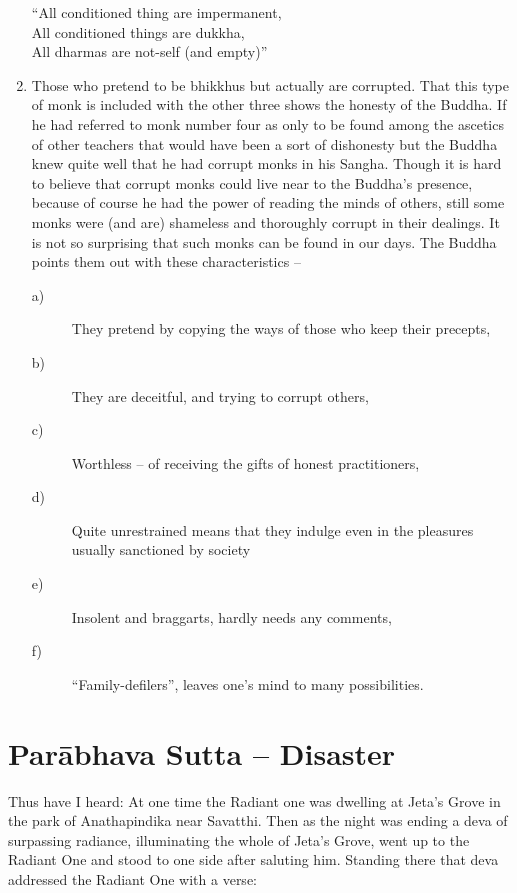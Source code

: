 \begin{enumerate}
\begin{MyDescription}[]{}   
   “All conditioned thing are impermanent,\\
   All conditioned things are dukkha,\\
   All dharmas are not-self (and empty)”
\end{MyDescription}
\item Those who pretend to be bhikkhus but actually are corrupted. That this type of monk is included with the other three shows the honesty of the Buddha. If he had referred to monk number four as only to be found among the ascetics of other teachers that would have been a sort of dishonesty but the Buddha knew quite well that he had corrupt monks in his Sangha. Though it is hard to believe that corrupt monks could live near to the Buddha's presence, because of course he had the power of reading the minds of others, still some monks were (and are) shameless and thoroughly corrupt in their dealings. It is not so surprising that such monks can be found in our days. The Buddha points them out with these characteristics – 
\begin{description}
\item[a)]They pretend by copying the ways of those who keep their precepts,
\item[b)]They are deceitful, and trying to corrupt others,
\item[c)]Worthless – of receiving the gifts of honest practitioners,
\item[d)]Quite unrestrained means that they indulge even in the pleasures usually sanctioned by society
\item[e)]Insolent and braggarts, hardly needs any comments,
\item[f)]“Family-defilers”, leaves one's mind to many possibilities.
\end{description}      
\end{enumerate}   
    
\chapter{Par\=abhava Sutta -- Disaster}
   
Thus have I heard: At one time the Radiant one was dwelling at Jeta's Grove in the park of Anathapindika near Savatthi. Then as the night was ending a deva of surpassing radiance, illuminating the whole of Jeta's Grove, went up to the Radiant One and stood to one side after saluting him. Standing there that deva addressed the Radiant One with a verse:
   
